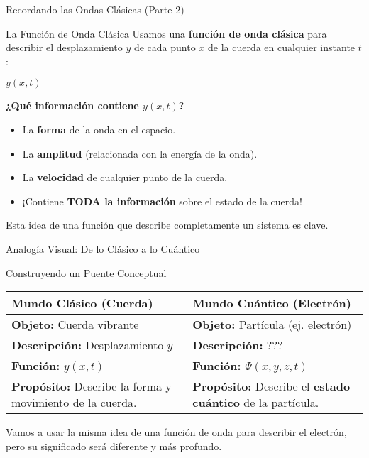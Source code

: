\documentclass{beamer}
\begin{document}
\begin{frame}{Recordando las Ondas Clásicas (Parte 2)}
  \begin{block}{La Función de Onda Clásica}
    Usamos una \textbf{función de onda clásica} para describir el desplazamiento $y$ de cada punto $x$ de la cuerda en cualquier instante $t$:
    \begin{center}
      \Large $y(x, t)$
    \end{center}
    \vspace{1em}
    \textbf{¿Qué información contiene $y(x, t)$?}
    \begin{itemize}
      \item La \textbf{forma} de la onda en el espacio.
      \item La \textbf{amplitud} (relacionada con la energía de la onda).
      \item La \textbf{velocidad} de cualquier punto de la cuerda.
      \item ¡Contiene \textbf{TODA la información} sobre el estado de la cuerda!
    \end{itemize}
  \end{block}
  Esta idea de una función que describe completamente un sistema es clave.
\end{frame}

\begin{frame}{Analogía Visual: De lo Clásico a lo Cuántico}
  \begin{block}{Construyendo un Puente Conceptual}
    \begin{tabular}{|m{}|m{}|}
      \hline
      \centering \textbf{Mundo Clásico (Cuerda)} & \centering \textbf{Mundo Cuántico (Electrón)} \\
      \hline
      \textbf{Objeto:} Cuerda vibrante & \textbf{Objeto:} Partícula (ej. electrón) \\
      \textbf{Descripción:} Desplazamiento $y$ & \textbf{Descripción:} ??? \\
      \textbf{Función:} \large $y(x, t)$ & \textbf{Función:} \large $\Psi(x, y, z, t)$ \\
      \textbf{Propósito:} Describe la forma y movimiento de la cuerda. & \textbf{Propósito:} Describe el \textbf{estado cuántico} de la partícula. \\
      \hline
    \end{tabular}
  \end{block}
  \vspace{1em}
  Vamos a usar la misma idea de una función de onda para describir el electrón, pero su significado será diferente y más profundo.
\end{frame}
\end{document}
